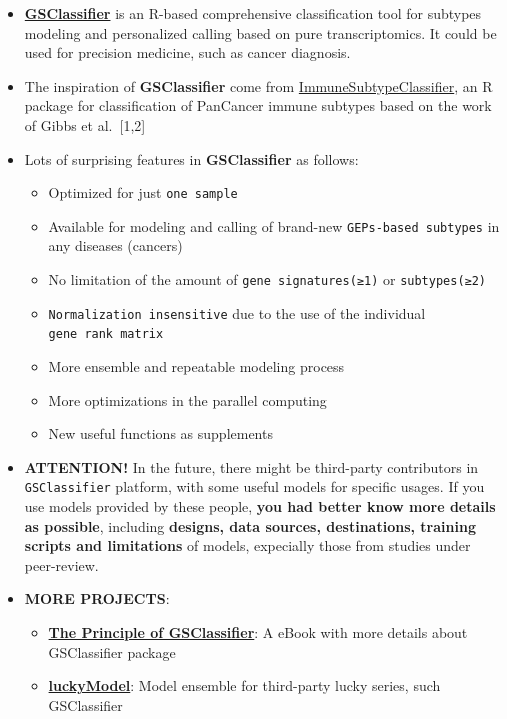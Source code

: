 \documentclass[
  12pt,
]{book}
\providecommand{\tightlist}{%
  \setlength{\itemsep}{0pt}\setlength{\parskip}{0pt}}
\begin{document}
\begin{itemize}
\tightlist
\item
  \href{https://github.com/huangwb8/GSClassifier}{\textbf{GSClassifier}} is an R-based comprehensive classification tool for subtypes modeling and personalized calling based on pure transcriptomics. It could be used for precision medicine, such as cancer diagnosis.
\item
  The inspiration of \textbf{GSClassifier} come from \href{https://github.com/CRI-iAtlas/ImmuneSubtypeClassifier}{ImmuneSubtypeClassifier}, an R package for classification of PanCancer immune subtypes based on the work of Gibbs et al.~{[}1,2{]}
\item
  Lots of surprising features in \textbf{GSClassifier} as follows:

  \begin{itemize}
  \tightlist
  \item
    Optimized for just \texttt{one\ sample}
  \item
    Available for modeling and calling of brand-new \texttt{GEPs-based\ subtypes} in any diseases (cancers)
  \item
    No limitation of the amount of \texttt{gene\ signatures(≥1)} or \texttt{subtypes(≥2)}
  \item
    \texttt{Normalization\ insensitive} due to the use of the individual \texttt{gene\ rank\ matrix}
  \item
    More ensemble and repeatable modeling process
  \item
    More optimizations in the parallel computing
  \item
    New useful functions as supplements
  \end{itemize}
\item
  \textbf{ATTENTION!} In the future, there might be third-party contributors in \texttt{GSClassifier} platform, with some useful models for specific usages. If you use models provided by these people, \textbf{you had better know more details as possible}, including \textbf{designs, data sources, destinations, training scripts and limitations} of models, expecially those from studies under peer-review.
\item
  \textbf{MORE PROJECTS}:

  \begin{itemize}
  \tightlist
  \item
    \href{https://huangwb8.github.io/GSClassifier.principle/}{\textbf{The Principle of GSClassifier}}: A eBook with more details about GSClassifier package
  \item
    \href{https://github.com/huangwb8/luckyModel}{\textbf{luckyModel}}: Model ensemble for third-party lucky series, such GSClassifier
  \end{itemize}
\end{itemize}
\end{document}
